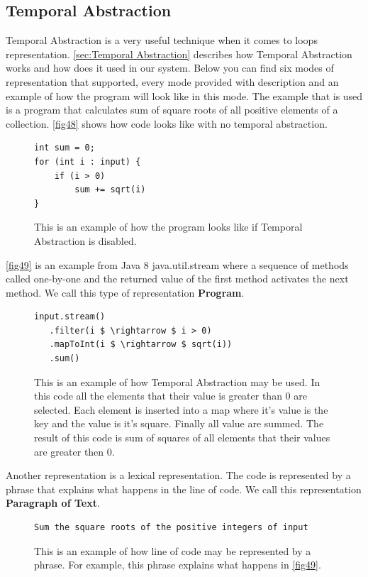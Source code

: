\subsection{Temporal Abstraction}
Temporal Abstraction is a very useful technique when it comes to loops representation. \autoref{sec:Temporal Abstraction} describes how Temporal Abstraction works and how does it used in our system. Below you can find six modes of representation that supported, every mode provided with description and an example of how the program will look like in this mode. The example that is used is a program that calculates sum of square roots of all positive elements of a collection.
\autoref{fig48} shows how code looks like with no temporal abstraction.
\begin{figure}[H]
\begin{lstlisting}
int sum = 0;
for (int i : input) {
    if (i > 0)
        sum += sqrt(i)
}
\end{lstlisting}
\caption{This is an example of how the program looks like if Temporal Abstraction is disabled.}
\label{fig48}
\end{figure}
\autoref{fig49} is an example from Java 8 java.util.stream where a sequence of methods called one-by-one and the returned value of the first method activates the next method. We call this type of representation \textbf{Program}.
\begin{figure}[H]
\begin{lstlisting}
input.stream()
   .filter(i $ \rightarrow $ i > 0)
   .mapToInt(i $ \rightarrow $ sqrt(i))
   .sum()
\end{lstlisting}
\caption{This is an example of how Temporal Abstraction may be used. In this code all the elements that their value is greater than 0 are selected. Each element is inserted into a map where it's value is the key and the value is it's square. Finally all value are summed. The result of this code is sum of squares of all elements that their values are greater then 0.}
\label{fig49}
\end{figure}
Another representation is a lexical representation. The code is represented by a phrase that explains what happens in the line of code. We call this representation \textbf{Paragraph of Text}.
\begin{figure}[H]
\begin{lstlisting}
Sum the square roots of the positive integers of input
\end{lstlisting}
\caption{This is an example of how line of code may be represented by a phrase. For example, this phrase explains what happens in \autoref{fig49}.}
\label{fig50}
\end{figure}
